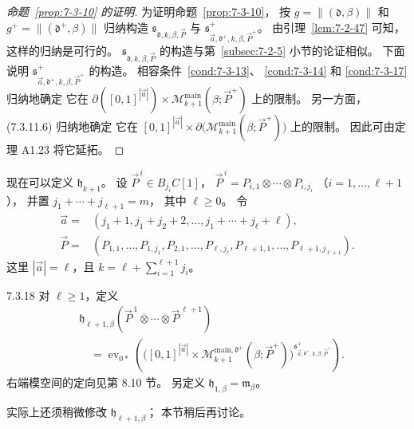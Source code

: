 
\begin{proof}[命题~\ref{prop:7-3-10} 的证明]
为证明命题~\ref{prop:7-3-10}，
按 $g=\|(\mathfrak d,\beta)\|$
和 $g^+=\|(\mathfrak d^+,\beta)\|$
归纳构造
$\mathfrak s_{\mathfrak d,k,\beta,\vec P}$
与
$\mathfrak s^+_{\vec a,\mathfrak d^+,k,\beta,\vec P^+}$。
由引理~\ref{lem:7-2-47} 可知，
这样的归纳是可行的。
$\mathfrak s_{\mathfrak d,k,\beta,\vec P}$
的构造与第~\ref{subsec:7-2-5} 小节的论证相似。
下面说明
$\mathfrak s^+_{\vec a,\mathfrak d^+,k,\beta,\vec P^+}$
的构造。
相容条件~\ref{cond:7-3-13}、
\ref{cond:7-3-14} 和
\ref{cond:7-3-17} 归纳地确定
它在
$\partial([0,1]^{|\vec a|})\times
\mathcal M^{\mathrm{main}}_{k+1}
(\beta;\vec P^+)$ 上的限制。
另一方面，(7.3.11.6) 归纳地确定
它在
$[0,1]^{|\vec a|}\times
\partial\bigl(\mathcal M^{\mathrm{main}}_{k+1}
(\beta;\vec P^+)\bigr)$ 上的限制。
因此可由定理 A1.23 将它延拓。
\end{proof}

现在可以定义 $\mathfrak h_{k+1}$。
设 $\vec P^{\,i}\in B_{j_i}C[1]$，
$\vec P^{\,i}=P_{i,1}\otimes\cdots\otimes P_{i,j_i}$
（$i=1,\ldots,\ell+1$），
并置 $j_1+\cdots+j_{\ell+1}=m$，
其中 $\ell\geq0$。
令
\[
\begin{aligned}
\vec a={}&(j_1+1,j_1+j_2+2,\ldots,
j_1+\cdots+j_\ell+\ell),\\
\vec P={}&(P_{1,1},\ldots,P_{1,j_1},
P_{2,1},\ldots,P_{\ell,j_\ell},
P_{\ell+1,1},\ldots,P_{\ell+1,j_{\ell+1}}).
\end{aligned}
\]
这里 $|\vec a|=\ell$，且
$k=\ell+\sum_{i=1}^{\ell+1}j_i$。

\begin{definition}{7.3.18}\label{def:7-3-18}
对 $\ell\geq1$，定义
\begin{equation}
\begin{aligned}
&\mathfrak h_{\ell+1,\beta}
(\vec P^{\,1}\mathbin{\overline\otimes}\cdots
\mathbin{\overline\otimes}\vec P^{\,\ell+1})\\
&\quad=\operatorname{ev}_{0*}\!\left(
\bigl([0,1]^{|\vec a|}\times
\mathcal M^{\mathrm{main},\mathfrak d^+}_{k+1}
(\beta;\vec P^+)\bigr)
^{\mathfrak s^+_{\vec a,\mathfrak d^+,k,\beta,\vec P^+}}
\right).
\end{aligned}
\tag{7.3.19}\label{eq:7-3-19}
\end{equation}
右端模空间的定向见第 8.10 节。
另定义 $\mathfrak h_{1,\beta}=\mathfrak m_\beta$。
\end{definition}

实际上还须稍微修改
$\mathfrak h_{\ell+1,\beta}$；
本节稍后再讨论。

